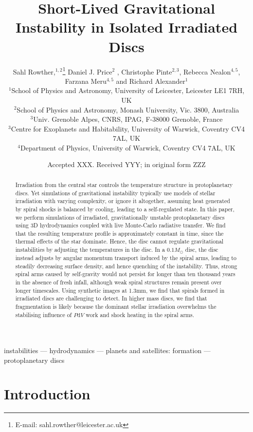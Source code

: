 \documentclass[usenatbib]{mnras}
\title[Gravitational instability in irradiated discs]{Short-Lived Gravitational Instability in Isolated Irradiated Discs}
\author[S. Rowther et al.]{Sahl Rowther,$^{1,2}$\thanks{E-mail: sahl.rowther@leicester.ac.uk}
Daniel J. Price$^{2}$
, Christophe Pinte$^{2,3}$, Rebecca Nealon$^{4,5}$, Farzana Meru$^{4,5}$ and
\newauthor  Richard Alexander$^{1}$
\\ 
$^{1}$School of Physics and Astronomy, University of Leicester, Leicester LE1 7RH, UK\\
$^{2}$School of Physics and Astronomy, Monash University, Vic. 3800, Australia\\
$^{3}$Univ. Grenoble Alpes, CNRS, IPAG, F-38000 Grenoble, France\\
$^3$Centre for Exoplanets and Habitability, University of Warwick, Coventry CV4 7AL, UK\\
$^{4}$Department of Physics, University of Warwick, Coventry CV4 7AL, UK
}
\date{Accepted XXX. Received YYY; in original form ZZZ}
\begin{document}
\label{firstpage}
\pagerange{\pageref{firstpage}--\pageref{lastpage}}
\maketitle 

\begin{abstract}
Irradiation from the central star controls the temperature structure in protoplanetary discs. Yet simulations of gravitational instability typically use models of stellar irradiation with varying complexity, or ignore it altogether, assuming heat generated by spiral shocks is balanced by cooling, leading to a self-regulated state. In this paper, we perform simulations of irradiated, gravitationally unstable protoplanetary discs using 3D hydrodynamics coupled with live Monte-Carlo radiative transfer. We find that the resulting temperature profile is approximately constant in time, since the thermal effects of the star dominate. Hence, the disc cannot regulate gravitational instabilities by adjusting the temperatures in the disc. In a $0.1M_\odot$ disc, the disc instead adjusts by angular momentum transport induced by the spiral arms, leading to steadily decreasing surface density, and hence quenching of the instability. Thus, strong spiral arms caused by self-gravity would not persist for longer than ten thousand years in the absence of fresh infall, although weak spiral structures remain present over longer timescales. Using synthetic images at 1.3mm, we find that spirals formed in irradiated discs are challenging to detect. In higher mass discs, we find that fragmentation is likely because the dominant stellar irradiation overwhelms the stabilising influence of $P\mathrm{d}V$ work and shock heating in the spiral arms.
\end{abstract}

\begin{keywords}
instabilities --- hydrodynamics --- planets and satellites: formation --- protoplanetary discs
\end{keywords}



\section{Introduction}
\end{document}
